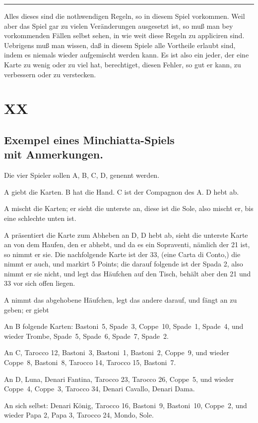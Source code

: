 \documentclass[11pt,a6paper,twoside]{article}
\begin{document}
\kern 2pt \hrule \kern 12pt

Alles dieses sind die nothwendigen Regeln, so in diesem Spiel vorkommen. Weil aber das Spiel gar zu vielen Veränderungen ausgesetzt ist, so muß man bey vorkommenden Fällen selbst sehen, in wie weit diese Regeln zu appliciren sind. Uebrigens muß man wissen, daß in diesem Spiele alle Vortheile erlaubt sind, indem es niemals wieder aufgemischt werden kann. Es ist also ein jeder, der eine Karte zu wenig oder zu viel hat, berechtiget, diesen Fehler, so gut er kann, zu verbessern oder zu verstecken.

\section{XX}
\subsection{Exempel eines Minchiatta-Spiels\\ mit Anmerkungen.}

Die vier Spieler sollen A, B, C, D, genennt werden.

A giebt die Karten. B hat die Hand. C ist der Compagnon des A. D hebt ab.

A mischt die Karten; er sieht die unterste an, diese ist die Sole, also mischt er, bis eine schlechte unten ist.

A präsentiert die Karte zum Abheben an D,
D hebt ab, sieht die unterste Karte an von dem Haufen, den er abhebt, und da es ein Sopraventi, nämlich der 21 ist, so nimmt er sie. Die nachfolgende Karte ist der 33, (eine Carta di Conto,) die nimmt er auch, und markirt 5 Points; die darauf folgende ist der Spada 2, also nimmt er sie nicht, und legt das Häufchen auf den Tisch, behält aber den 21 und 33 vor sich offen liegen.

A nimmt das abgehobene Häufchen, legt das andere darauf, und fängt an zu geben; er giebt

An B folgende Karten: Bastoni~5, Spade~3, Coppe~10, Spade~1, Spade~4, und wieder Trombe, Spade~5, Spade~6, Spade~7, Spade~2.

An C, Tarocco 12, Bastoni~3, Bastoni~1, Bastoni~2, Coppe~9, und wieder Coppe~8, Bastoni~8, Tarocco 14, Tarocco 15, Bastoni~7.

An D, Luna, Denari Fantina, Tarocco 23, Tarocco 26, Coppe~5, und wieder Coppe~4, Coppe~3, Tarocco 34, Denari Cavallo, Denari Dama.

An sich selbst: Denari König, Tarocco 16, Bastoni~9, Bastoni~10, Coppe~2, und wieder Papa 2, Papa 3, Tarocco 24, Mondo, Sole.
\end{document}
